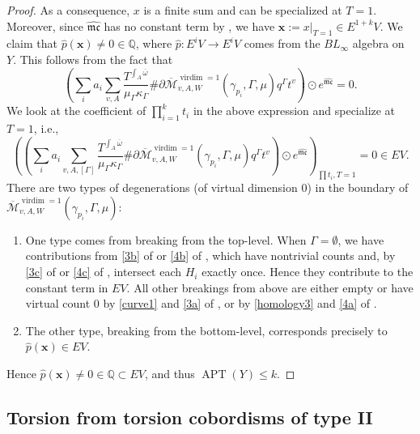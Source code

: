 \documentclass[11pt]{amsart}
\numberwithin{equation}{section}
\def\Q{{\mathbb Q}}
\def\cM{{\mathcal M}}
\def\mc{{\mathfrak {mc}}}
\DeclareMathOperator{\virdim}{virdim}
\DeclareMathOperator{\APT}{APT}
\begin{document}
\begin{proof}
As a consequence, $x$ is a finite sum and can be specialized at $T=1$. Moreover, since $\hat{\mc}$ has no constant term by , we have $\bm{x}:=x|_{T=1}\in E^{1+k}V$. 
We claim that $\widehat{p}(\bm{x})\ne 0 \in \Q$, where $\widehat{p}:E^iV \to E^iV$ comes from the $BL_\infty$ algebra on $Y$. This follows from the fact that
$$\left(\sum_i a_i \sum_{v, A} \frac{T^{\int_A \overline{\omega}}}{\mu_{\Gamma}\kappa_{\Gamma}}\#\partial\overline{\cM}^{\virdim =1}_{v,A,W}(\gamma_{p_i},\Gamma, \mu)q^{\Gamma}t^v\right)\odot e^{\hat{\mc}}=0.$$
We look at the coefficient of $\prod_{i=1}^k t_i$ in the above expression and specialize at $T=1$, i.e.,
\begin{equation*}
    \left(\left(\sum_i a_i \sum_{v, A, [\Gamma]} \frac{T^{\int_A \overline{\omega}}}{\mu_{\Gamma}\kappa_{\Gamma}}\#\partial\overline{\cM}^{\virdim =1}_{v,A,W}(\gamma_{p_i},\Gamma, \mu)q^{\Gamma}t^v\right)\odot e^{\hat{\mc}}\right)_{\prod t_i, T=1}=0\in EV.
\end{equation*}
There are two types of degenerations (of virtual dimension $0$) in the boundary of $\overline{\cM}^{\virdim =1}_{v,A,W}(\gamma_{p_i},\Gamma, \mu)$: 
\begin{enumerate}
    \item One type comes from breaking from the top-level. When $\Gamma=\emptyset$, we have contributions from \eqref{3b} of  or \eqref{4b} of , which have nontrivial counts and, by \eqref{3c} of  or \eqref{4c} of , intersect each $H_i$ exactly once. Hence they contribute to the constant term in $EV$. All other breakings from above are either empty or have virtual count $0$ by \eqref{curve1} and \eqref{3a} of , or by \eqref{homology3} and \eqref{4a} of .
    \item The other type, breaking from the bottom-level, corresponds precisely to $\widehat{p}(\bm{x})\in EV$. 
\end{enumerate}
Hence $\widehat{p}(\bm{x})\ne 0 \in \Q\subset EV$, and thus $\APT(Y)\le k$.
\end{proof}


\subsection{Torsion from torsion cobordisms of type II}\label{ss:torsion_II}
\end{document}
